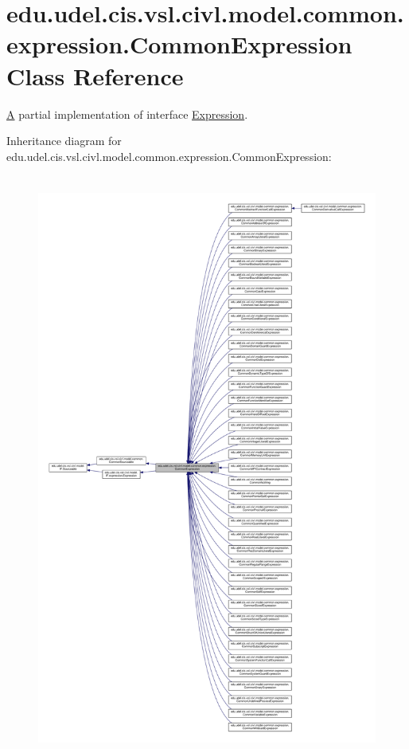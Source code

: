 \hypertarget{classedu_1_1udel_1_1cis_1_1vsl_1_1civl_1_1model_1_1common_1_1expression_1_1CommonExpression}{}\section{edu.\+udel.\+cis.\+vsl.\+civl.\+model.\+common.\+expression.\+Common\+Expression Class Reference}
\label{classedu_1_1udel_1_1cis_1_1vsl_1_1civl_1_1model_1_1common_1_1expression_1_1CommonExpression}


\hyperlink{structA}{A} partial implementation of interface \hyperlink{}{Expression}.  




Inheritance diagram for edu.\+udel.\+cis.\+vsl.\+civl.\+model.\+common.\+expression.\+Common\+Expression\+:
\nopagebreak
\begin{figure}[H]
\begin{center}
\leavevmode
\includegraphics[height=550pt]{classedu_1_1udel_1_1cis_1_1vsl_1_1civl_1_1model_1_1common_1_1expression_1_1CommonExpression__inherit__graph}
\end{center}
\end{figure}


